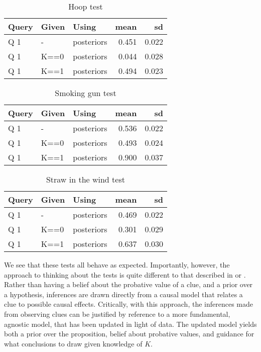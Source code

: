 \documentclass[
  12pt,
]{book}
\begin{document}
\begin{table}

\caption{\label{tab:unnamed-chunk-91}Hoop test}
\centering
\begin{tabular}[t]{l|l|l|r|r}
\hline
Query & Given & Using & mean & sd\\
\hline
Q 1 & - & posteriors & 0.451 & 0.022\\
\hline
Q 1 & K==0 & posteriors & 0.044 & 0.028\\
\hline
Q 1 & K==1 & posteriors & 0.494 & 0.023\\
\hline
\end{tabular}
\end{table}

\begin{table}

\caption{\label{tab:unnamed-chunk-91}Smoking gun test}
\centering
\begin{tabular}[t]{l|l|l|r|r}
\hline
Query & Given & Using & mean & sd\\
\hline
Q 1 & - & posteriors & 0.536 & 0.022\\
\hline
Q 1 & K==0 & posteriors & 0.493 & 0.024\\
\hline
Q 1 & K==1 & posteriors & 0.900 & 0.037\\
\hline
\end{tabular}
\end{table}

\begin{table}

\caption{\label{tab:unnamed-chunk-91}Straw in the wind test}
\centering
\begin{tabular}[t]{l|l|l|r|r}
\hline
Query & Given & Using & mean & sd\\
\hline
Q 1 & - & posteriors & 0.469 & 0.022\\
\hline
Q 1 & K==0 & posteriors & 0.301 & 0.029\\
\hline
Q 1 & K==1 & posteriors & 0.637 & 0.030\\
\hline
\end{tabular}
\end{table}

We see that these tests all behave as expected. Importantly, however, the approach to thinking about the tests is quite different to that described in \citet{collier2011understanding} or \citet{humphreys2015mixing}. Rather than having a belief about the probative value of a clue, and a prior over a hypothesis, inferences are drawn directly from a causal model that relates a clue to possible causal effects. Critically, with this approach, the inferences made from observing clues can be justified by reference to a more fundamental, agnostic model, that has been updated in light of data. The updated model yields both a prior over the proposition, belief about probative values, and guidance for what conclusions to draw given knowledge of \(K\).
\end{document}

